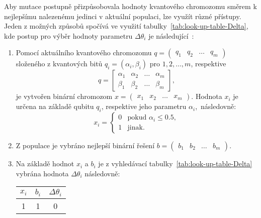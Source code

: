 Aby mutace postupně přizpůsobovala hodnoty kvantového chromozomu směrem k nejlepšímu nalezenému jedinci v aktuální populaci, lze využít různé přístupy. 
Jeden z možných způsobů spočívá ve využití tabulky~\ref{tab:look-up-table-Delta}, kde postup pro výběr hodnoty parametru $\Delta\theta_i$ je následující~\cite{NaturalComputing}:
\begin{enumerate}
    \item Pomocí aktuálního kvantového chromozomu $q = \begin{pmatrix} q_1 & q_2 & \dots & q_m \end{pmatrix}$ složeného z kvantových bitů $ q_i = \left( \alpha_i, \beta_i \right)$ pro $1,2,\dots,m$, respektive
        \begin{equation*}
            q =
            \begin{bmatrix}
                \alpha_1 & \alpha_2 & \dots & \alpha_m \\
                \beta_1  & \beta_2  & \dots & \beta_m
            \end{bmatrix},
        \end{equation*}
        je vytvořen binární chromozom $x = \begin{pmatrix} x_1 & x_2 & \dots & x_m \end{pmatrix}$.
        Hodnota $x_i$ je určena na základě qubitu $q_i$, respektive jeho parametru $\alpha_i$,~následovně:
        \begin{equation*}
            x_i =
            \begin{cases} 
                0 & \text{pokud } \alpha_i \leq 0.5, \\
                1 & \text{jinak}.
            \end{cases}
        \end{equation*}
    \item Z populace je vybráno nejlepší binární řešení $b = \begin{pmatrix} b_1 & b_2 & \dots & b_m \end{pmatrix}$.
    \item Na základě hodnot $x_i$ a $b_i$ je z vyhledávací tabulky~\ref{tab:look-up-table-Delta} vybrána hodnota $\Delta\theta_i$ následovně:
        \begin{table}[ht!]
            \centering
            \begin{tabular}{|c c|c|}
            \hline
            $x_i$ & $b_i$ & $\Delta\theta_i$ \\
            \hline
            1     & 1     & 0                \\ 

\end{tabular}
\end{table}
\end{enumerate}
